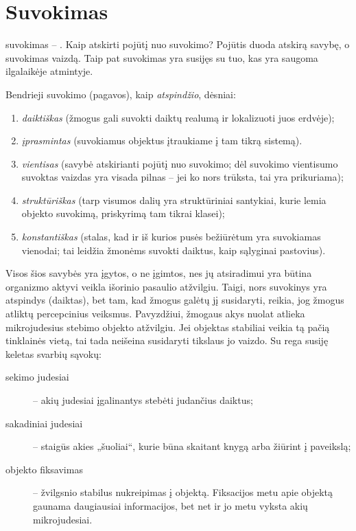 \section{Suvokimas}

\label{tema:suvokimas}

\Gls{suvokimas} – . Kaip atskirti pojūtį nuo 
suvokimo? Pojūtis duoda atskirą savybę, o suvokimas vaizdą. Taip pat 
suvokimas yra susijęs su tuo, kas yra saugoma ilgalaikėje atmintyje.

Bendrieji suvokimo (pagavos), kaip \emph{atspindžio}, dėsniai:
\begin{enumerate}
  \item \emph{daiktiškas} (žmogus gali suvokti daiktų realumą ir 
    lokalizuoti juos erdvėje);
  \item \emph{įprasmintas} (suvokiamus objektus įtraukiame į tam tikrą 
    sistemą).
  \item \emph{vientisas} (savybė atskirianti pojūtį nuo suvokimo; dėl
    suvokimo vientisumo suvoktas vaizdas yra visada pilnas – jei ko nors
    trūksta, tai yra prikuriama);
  \item \emph{struktūriškas} (tarp visumos dalių yra struktūriniai 
    santykiai, kurie lemia objekto suvokimą, priskyrimą tam tikrai klasei);
  \item \emph{konstantiškas} (stalas, kad ir iš kurios pusės bežiūrėtum
    yra suvokiamas vienodai; tai leidžia žmonėms suvokti daiktus, kaip 
    sąlyginai pastovius).
\end{enumerate}
Visos šios savybės yra įgytos, o ne įgimtos, nes jų atsiradimui yra
būtina organizmo aktyvi veikla išorinio pasaulio atžvilgiu. Taigi, nors
suvokinys yra atspindys (daiktas), bet tam, kad žmogus galėtų jį
susidaryti, reikia, jog žmogus atliktų percepcinius veiksmus. Pavyzdžiui,
žmogaus akys nuolat atlieka mikrojudesius stebimo objekto atžvilgiu.
Jei objektas stabiliai veikia tą pačią tinklainės vietą, tai tada 
neišeina susidaryti tikslaus jo vaizdo. Su rega susiję keletas svarbių 
sąvokų:
\begin{description}
  \item[sekimo judesiai] – akių judesiai įgalinantys stebėti judančius
    daiktus;
  \item[sakadiniai judesiai] – staigūs akies „šuoliai“, kurie būna skaitant
    knygą arba žiūrint į paveikslą;
  \item[objekto fiksavimas] – žvilgsnio stabilus nukreipimas į objektą.
    Fiksacijos metu apie objektą gaunama daugiausiai informacijos, bet
    net ir jo metu vyksta akių mikrojudesiai.
\end{description}


